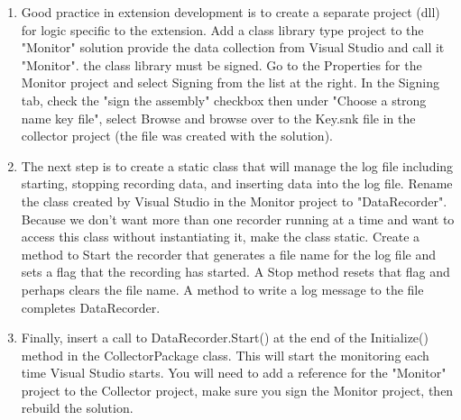 \begin{Exercise}[type={program}, difficulty={1}]
\begin{enumerate}
\item
Good practice in extension development is to create a separate project (dll) for logic specific to the extension.  Add a class library type project to  the "Monitor" solution provide the data collection from Visual Studio and call it "Monitor".  the class library must be signed.  Go to the Properties for the Monitor project and select Signing from the list at the right.  In the Signing tab, check the "sign the assembly" checkbox then under "Choose a strong name key file", select Browse and browse over to the Key.snk file in the collector project (the file was created with the solution).
\item
The next step is to create a static class that will manage the log file including starting, stopping recording data, and inserting data into the log file.  Rename the class created by Visual Studio in the Monitor project to "DataRecorder".    Because we don't want more than one recorder running at a time and want to access this class without instantiating it, make the class static.  Create a method to Start the recorder that generates a file name for the log file and sets a flag that the recording has started. A Stop method resets that flag and perhaps clears the file name.  A method to write a log message to the file completes DataRecorder.
\item
Finally, insert a call to DataRecorder.Start() at the end of the Initialize() method in the CollectorPackage class.  This will start the monitoring each time Visual Studio starts.  You will need to add a reference for the "Monitor" project to the Collector project, make sure you sign the Monitor project, then rebuild the solution.
\end{enumerate}
\end{Exercise}


